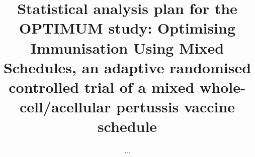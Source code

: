 \documentclass{bmcart}
\begin{document}
\begin{frontmatter}

\begin{fmbox}


\title{Statistical analysis plan for the OPTIMUM study: Optimising Immunisation Using Mixed Schedules, an adaptive randomised controlled trial of a mixed whole-cell/acellular pertussis vaccine schedule}


\author[
  addressref={aff1},                   %
  corref={aff1},                       %
  email={james.totterdell@sydney.edu.au}   %
]{ }
\author[
  addressref={aff2},
  email={...}
]{...}


\address[id=aff1]{%
  ,             %
  ,          %
  ,                              %
}
\address[id=aff2]{%
  ,
  ,
  ,
}


\end{fmbox}
\end{frontmatter}
\end{document}

